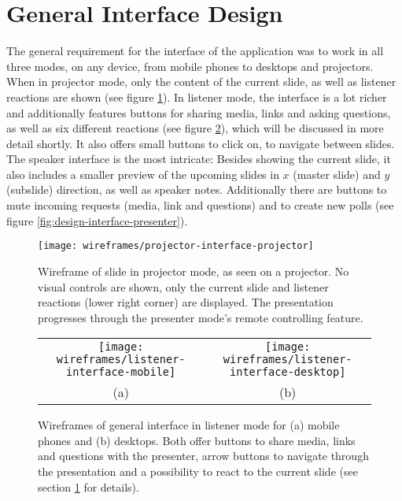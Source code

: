 

\section{General Interface Design}
The general requirement for the interface of the application was to work in all three modes, on any device, from mobile phones to desktops and projectors. When in projector mode, only the content of the current slide, as well as listener reactions are shown (see figure \ref{fig:design-interface-projector}). In listener mode, the interface is a lot richer and additionally features buttons for sharing media, links and asking questions, as well as six different reactions (see figure \ref{fig:design-interface-listener}), which will be discussed in more detail shortly. It also offers small buttons to click on, to navigate between slides. The speaker interface is the most intricate: Besides showing the current slide, it also includes a smaller preview of the upcoming slides in $x$ (master slide) and $y$ (subslide) direction, as well as speaker notes. Additionally there are buttons to mute incoming requests (media, link and questions) and to create new polls (see figure \ref{fig:design-interface-presenter}).

\begin{figure}
\centering
\texttt{[image: wireframes/projector-interface-projector]}
\caption{Wireframe of slide in projector mode, as seen on a projector. No visual controls are shown, only the current slide and listener reactions (lower right corner) are displayed. The presentation progresses through the presenter mode's remote controlling feature.}
\label{fig:design-interface-projector}
\end{figure}

\begin{figure}
\centering\small
\begin{tabular}{cc}
\texttt{[image: wireframes/listener-interface-mobile]} &
\texttt{[image: wireframes/listener-interface-desktop]}\\
(a) & (b)
\end{tabular}
\caption{Wireframes of general interface in listener mode for (a) mobile phones and (b) desktops. Both offer buttons to share media, links and questions with the presenter, arrow buttons to navigate through the presentation and a possibility to react to the current slide (see section \ref{} for details).}
\label{fig:design-interface-listener}
\end{figure}


